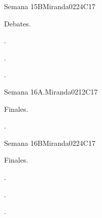 \begin{syllabus}
\begin{unit}{Semana 15B}{}{Miranda02}{24}{C17}
   \begin{topics}
      \item Debates.
   \end{topics}

   \begin{learningoutcomes}
      \item . 
      \item .
      \item . 
      \end{learningoutcomes}
\end{unit}

\begin{unit}{Semana 16A.}{}{Miranda02}{12}{C17}
   \begin{topics}
      \item Finales.
   \end{topics}
   \begin{learningoutcomes}
      \item . 
   \end{learningoutcomes}
\end{unit}

\begin{unit}{Semana 16B}{}{Miranda02}{24}{C17}
   \begin{topics}
      \item Finales.
   \end{topics}

   \begin{learningoutcomes}
      \item . 
      \item .
      \item . 
      \end{learningoutcomes}
\end{unit}



\begin{coursebibliography}
\end{coursebibliography}

\end{syllabus}
